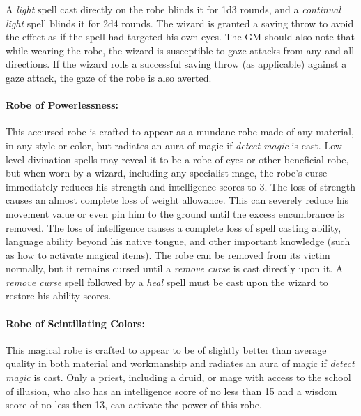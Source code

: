 \begin{multicols}{2}
A \textit{light} spell cast directly on the robe blinds it for 1d3 rounds, and a \textit{continual light} spell blinds it for 2d4 rounds.  The wizard is granted a saving throw to avoid the effect as if the spell had targeted his own eyes.  The GM should also note that while wearing the robe, the wizard is susceptible to gaze attacks from any and all directions.  If the wizard rolls a successful saving throw (as applicable) against a gaze attack, the gaze of the robe is also averted.

\paragraph{Robe of Powerlessness:} This accursed robe is crafted to appear as a mundane robe made of any material, in any style or color, but radiates an aura of magic if \textit{detect magic} is cast.  Low-level divination spells may reveal it to be a robe of eyes or other beneficial robe, but when worn by a wizard, including any specialist mage, the robe's curse immediately reduces his strength and intelligence scores to 3.  The loss of strength causes an almost complete loss of weight allowance.  This can severely reduce his movement value or even pin him to the ground until the excess encumbrance is removed.  The loss of intelligence causes a complete loss of spell casting ability, language ability beyond his native tongue, and other important knowledge (such as how to activate magical items).  The robe can be removed from its victim normally, but it remains cursed until a \textit{remove curse} is cast directly upon it.   A \textit{remove curse} spell followed by a \textit{heal} spell must be cast upon the wizard to restore his ability scores.  

\paragraph{Robe of Scintillating Colors:} This magical robe is crafted to appear to be of slightly better than average quality in both material and workmanship and radiates an aura of magic if \textit{detect magic} is cast.  Only a priest, including a druid, or mage with access to the school of illusion, who also has an intelligence score of no less than 15 and a wisdom score of no less then 13, can activate the power of this robe.  


\end{multicols}
